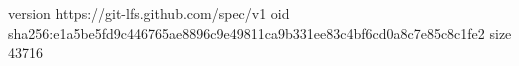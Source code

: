 version https://git-lfs.github.com/spec/v1
oid sha256:e1a5be5fd9c446765ae8896c9e49811ca9b331ee83c4bf6cd0a8c7e85c8c1fe2
size 43716
